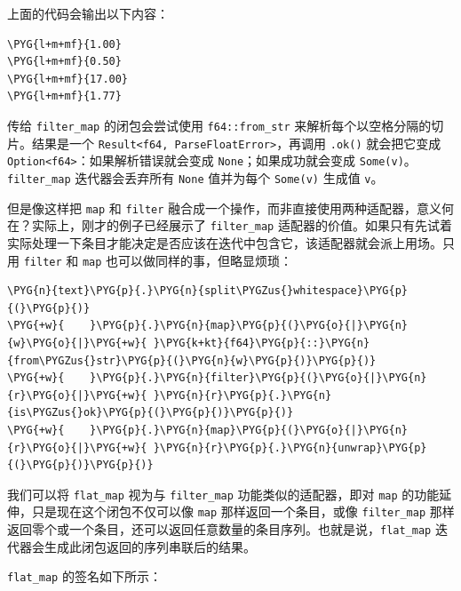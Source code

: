 上面的代码会输出以下内容：

\begin{Verbatim}[commandchars=\\\{\},breaklines=true,breakanywhere=true,fontsize=\codefont,xleftmargin=17bp]
\PYG{l+m+mf}{1.00}
\PYG{l+m+mf}{0.50}
\PYG{l+m+mf}{17.00}
\PYG{l+m+mf}{1.77}
\end{Verbatim}

传给 \texttt{filter\_map} 的闭包会尝试使用 \texttt{f64::from\_str} 来解析每个以空格分隔的切片。结果是一个 \texttt{Result<f64, ParseFloatError>}，再调用 \texttt{.ok()} 就会把它变成 \texttt{Option<f64>}：如果解析错误就会变成 \texttt{None}；如果成功就会变成 \texttt{Some(v)}。\texttt{filter\_map} 迭代器会丢弃所有 \texttt{None} 值并为每个 \texttt{Some(v)} 生成值 \texttt{v}。

但是像这样把 \texttt{map} 和 \texttt{filter} 融合成一个操作，而非直接使用两种适配器，意义何在？实际上，刚才的例子已经展示了 \texttt{filter\_map} 适配器的价值。如果只有先试着实际处理一下条目才能决定是否应该在迭代中包含它，该适配器就会派上用场。只用 \texttt{filter} 和 \texttt{map} 也可以做同样的事，但略显烦琐：

\begin{Verbatim}[commandchars=\\\{\},breaklines=true,breakanywhere=true,fontsize=\codefont,xleftmargin=17bp]
\PYG{n}{text}\PYG{p}{.}\PYG{n}{split\PYGZus{}whitespace}\PYG{p}{(}\PYG{p}{)}
\PYG{+w}{    }\PYG{p}{.}\PYG{n}{map}\PYG{p}{(}\PYG{o}{|}\PYG{n}{w}\PYG{o}{|}\PYG{+w}{ }\PYG{k+kt}{f64}\PYG{p}{::}\PYG{n}{from\PYGZus{}str}\PYG{p}{(}\PYG{n}{w}\PYG{p}{)}\PYG{p}{)}
\PYG{+w}{    }\PYG{p}{.}\PYG{n}{filter}\PYG{p}{(}\PYG{o}{|}\PYG{n}{r}\PYG{o}{|}\PYG{+w}{ }\PYG{n}{r}\PYG{p}{.}\PYG{n}{is\PYGZus{}ok}\PYG{p}{(}\PYG{p}{)}\PYG{p}{)}
\PYG{+w}{    }\PYG{p}{.}\PYG{n}{map}\PYG{p}{(}\PYG{o}{|}\PYG{n}{r}\PYG{o}{|}\PYG{+w}{ }\PYG{n}{r}\PYG{p}{.}\PYG{n}{unwrap}\PYG{p}{(}\PYG{p}{)}\PYG{p}{)}
\end{Verbatim}

我们可以将 \texttt{flat\_map} 视为与 \texttt{filter\_map} 功能类似的适配器，即对 \texttt{map} 的功能延伸，只是现在这个闭包不仅可以像 \texttt{map} 那样返回一个条目，或像 \texttt{filter\_map} 那样返回零个或一个条目，还可以返回任意数量的条目序列。也就是说，\texttt{flat\_map} 迭代器会生成此闭包返回的序列串联后的结果。

\texttt{flat\_map} 的签名如下所示：

